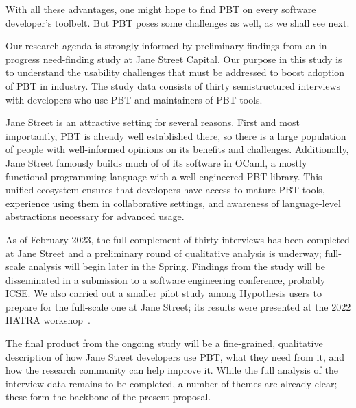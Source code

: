 With all these advantages, one might hope to find PBT on every
software developer's toolbelt.  But PBT poses some challenges as well,
as we shall see next.

%
Our research agenda is strongly informed by preliminary findings from
an in-progress need-finding study at Jane Street Capital.  Our purpose
in this
study is to understand the usability challenges that must be addressed
to boost adoption of PBT in
industry. The study data consists of thirty semistructured interviews
with developers who use PBT and maintainers of PBT tools.

Jane Street is
an attractive setting for several reasons.  First and most
importantly, PBT is
already well established there, so there is a large
population of people with well-informed opinions on its benefits and
challenges. Additionally, Jane Street famously builds much of of its
software in OCaml, a mostly functional programming language with
a well-engineered PBT library. This unified
ecosystem ensures that developers have access to mature PBT tools,
experience using them in collaborative settings,
and awareness of language-level abstractions necessary
for advanced usage.

As of February 2023, the full complement of thirty interviews has been
completed at Jane Street and a preliminary round of qualitative
analysis is underway; full-scale analysis will begin later in the Spring.
Findings from the study will be disseminated in a submission to a
software engineering conference, probably ICSE.  We also carried out a
smaller pilot study among Hypothesis users to prepare for the
full-scale one at Jane Street; its results were presented at the
2022 HATRA workshop~\cite{goldstein_problems_2022}.

 The final product from
the ongoing study will be a fine-grained, qualitative description of how
Jane Street developers use PBT, what they need from it, and how the
research community can
help improve it.  While the full analysis of the interview data remains
to be completed, a number of themes are already clear; these
form the backbone of the present proposal.

